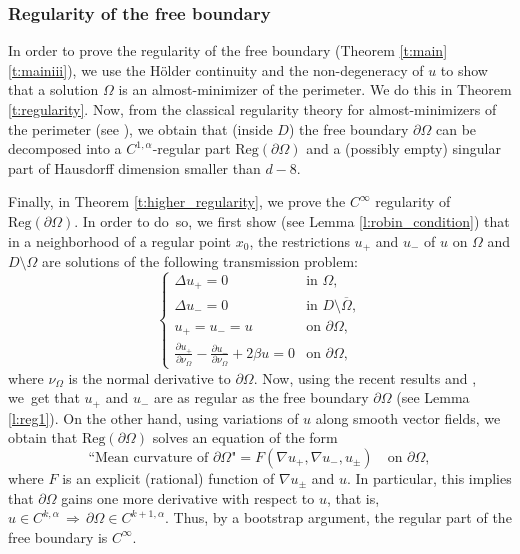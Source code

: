 \documentclass[11pt]{article}
\numberwithin{equation}{section}
\theoremstyle{plain}
\theoremstyle{definition}
\let\ds\displaystyle
\begin{document}
\subsubsection{Regularity of the free boundary} In order to prove the regularity of the free boundary (Theorem \ref{t:main}\eqref{t:mainiii}), we use the Hölder continuity and the non-degeneracy of $u$ to show that a solution $\Omega$ is an almost-minimizer of the perimeter. We do this in Theorem \ref{t:regularity}. Now, from the classical regularity theory for almost-minimizers of the perimeter (see \cite{tamanini}), we obtain that (inside $D$) the free boundary $\partial\Omega$ can be decomposed into a $C^{1,\alpha}$-regular part $\text{Reg}(\partial\Omega)$ and a (possibly empty) singular part of Hausdorff dimension smaller than $d-8$.

Finally, in Theorem \ref{t:higher_regularity}, we prove the $C^\infty$ regularity of $\text{Reg}(\partial\Omega)$. In order to do~so, we first show (see Lemma \ref{l:robin_condition}) that in a neighborhood of a regular point $x_0$, the restrictions $u_+$ and $u_-$ of $u$ on $\Omega$ and $D\setminus\Omega$ are solutions of the following transmission problem:
\[\begin{cases}
\Delta u_+=0&\text{in } \Omega,\\
\Delta u_-=0&\text{in } D\setminus\overline\Omega,\\
u_+=u_-=u&\text{on }\partial\Omega,\\
\ds\frac{\partial u_+}{\partial \nu_\Omega}-\frac{\partial u_-}{\partial \nu_\Omega}+2\beta u=0&\text{on } \partial\Omega,
\end{cases}\]
where $\nu_\Omega$ is the normal derivative to $\partial\Omega$. Now, using the recent results \cite{css} and \cite{D}, we~get that $u_+$ and $u_-$ are as regular as the free boundary $\partial\Omega$ (see Lemma \ref{l:reg1}). On the other hand, using variations of $u$ along smooth vector fields, we obtain that $\text{Reg}(\partial\Omega)$ solves an equation of the form
\[\text{``Mean curvature of $\partial\Omega$"}=F(\nabla u_+,\nabla u_-,u_\pm)\quad\text{on } \partial\Omega,\]
where $F$ is an explicit (rational) function of $\nabla u_\pm$ and $u$.
In particular, this implies that $\partial\Omega$ gains one more derivative with respect to $u$, that is, $u\in C^{k,\alpha}\,\Rightarrow\,\partial\Omega\in C^{k+1,\alpha}$. Thus, by a bootstrap argument, the regular part of the free boundary is $C^\infty$.
\end{document}
